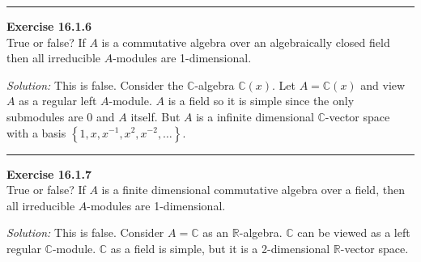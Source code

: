 \documentclass[a4paper, 12pt]{article}
\newenvironment{problem}[2][Exercise]
    { \begin{mdframed}[backgroundcolor=gray!20] \textbf{#1 #2} \\}
    {  \end{mdframed}}
\newenvironment{solution}
    {\textit{Solution:}}
    {}
\begin{document}
\noindent\rule{7in}{2.8pt}
\begin{problem}{16.1.6}
True or false? If \(A\) is a commutative algebra over an algebraically closed field then all irreducible \(A\)-modules are 1-dimensional.
\end{problem}
\begin{solution}
This is false. Consider the \(\mathbb{C}\)-algebra \(\mathbb{C}(x)\). Let \(A=\mathbb{C}(x)\) and view \(A\) as a regular left \(A\)-module. \(A\) is a field so it is simple since 
the only submodules are \(0\) and \(A\) itself. But \(A\) is a infinite dimensional \(\mathbb{C}\)-vector space with a basis \(\left\{ 1,x,x^{-1},x^2,x^{-2},\ldots \right\}\).
\end{solution}

\noindent\rule{7in}{2.8pt}
\begin{problem}{16.1.7}
True or false? If \(A\) is a finite dimensional commutative algebra over a field, then all irreducible \(A\)-modules are 1-dimensional.
\end{problem}
\begin{solution}
This is false. Consider \(A=\mathbb{C}\) as an \(\mathbb{R}\)-algebra. \(\mathbb{C}\) can be viewed as a left regular \(\mathbb{C}\)-module. \(\mathbb{C}\) as a field is simple, but it is a 
2-dimensional \(\mathbb{R}\)-vector space.
\end{solution}
\end{document}

